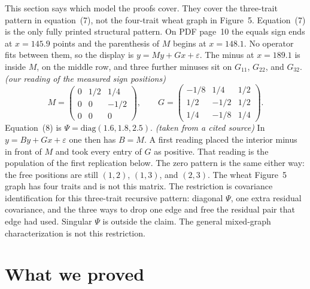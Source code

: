 \documentclass[11pt]{article}
\newcommand{\ev}[1]{\textup{\emph{(#1)}}}
\begin{document}
This section says which model the proofs cover. They cover the three-trait
pattern in equation~(7), not the four-trait wheat graph in Figure~5.
Equation~(7) is the only fully printed structural pattern. On PDF page~10
the equals sign ends at $x=145.9$ points and the parenthesis of $M$ begins at
$x=148.1$. No operator fits between them, so the display is
$y=My+Gx+\varepsilon$. The minus at $x=189.1$ is inside $M$, on the middle
row, and three further minuses sit on $G_{11}$, $G_{22}$, and $G_{32}$.
\ev{our reading of the measured sign positions}
\[
M=\begin{pmatrix}0&1/2&1/4\\0&0&-1/2\\0&0&0\end{pmatrix},\qquad
G=\begin{pmatrix}-1/8&1/4&1/2\\1/2&-1/2&1/2\\1/4&-1/8&1/4\end{pmatrix}.
\]
Equation~(8) is $\Psi=\mathrm{diag}(1.6,1.8,2.5)$.
\ev{taken from a cited source}
In $y=By+Gx+\varepsilon$ one then has $B=M$. A first reading placed the
interior minus in front of $M$ and took every entry of $G$ as positive.
That reading is the population of the first replication below. The zero
pattern is the same either way: the free positions are still $(1,2)$,
$(1,3)$, and $(2,3)$.
The wheat Figure~5 graph has four traits and is not this matrix. The
restriction is covariance identification for this three-trait recursive
pattern: diagonal $\Psi$, one extra residual covariance, and the three ways
to drop one edge and free the residual pair that edge had used. Singular
$\Psi$ is outside the claim. The general mixed-graph characterization is not
this restriction.

\section{What we proved}
\end{document}
